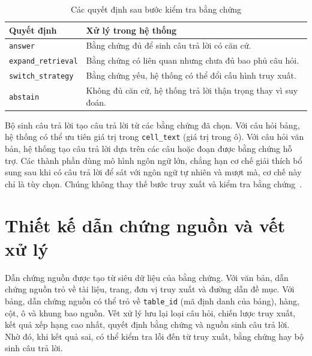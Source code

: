 \documentclass[../DoAn.tex]{subfiles}
\begin{document}
\begin{table}[H]
\centering
\small
\renewcommand{\arraystretch}{1.2}
\caption{Các quyết định sau bước kiểm tra bằng chứng}
\label{tab:evidence-check-decisions-revised}
\begin{tabularx}{\textwidth}{
    |>{\raggedright\arraybackslash}p{}
    |>{\raggedright\arraybackslash}X|
}
\hline
\textbf{Quyết định} & \textbf{Xử lý trong hệ thống} \\
\hline
\texttt{answer} &
Bằng chứng đủ để sinh câu trả lời có căn cứ. \\
\hline
\texttt{expand\_retrieval} &
Bằng chứng có liên quan nhưng chưa đủ bao phủ câu hỏi. \\
\hline
\texttt{switch\_strategy} &
Bằng chứng yếu, hệ thống có thể đổi cấu hình truy xuất. \\
\hline
\texttt{abstain} &
Không đủ căn cứ, hệ thống trả lời thận trọng thay vì suy đoán. \\
\hline
\end{tabularx}
\end{table}

Bộ sinh câu trả lời tạo câu trả lời từ các bằng chứng đã chọn. Với câu hỏi bảng, hệ
thống có thể ưu tiên giá trị trong \texttt{cell\_text} (giá trị trong ô). Với câu hỏi văn bản, hệ thống
tạo câu trả lời dựa trên các câu hoặc đoạn được bằng chứng hỗ trợ. Các thành phần dùng mô hình ngôn ngữ lớn, chẳng hạn cơ chế giải thích bổ sung sau khi có câu trả lời để sát với ngôn ngữ tự nhiên và mượt mà, cơ chế này chỉ là tùy chọn. Chúng không thay thế bước truy xuất
và kiểm tra bằng chứng~\cite{lewis2020rag}.

\section{Thiết kế dẫn chứng nguồn và vết xử lý}
\label{section:citation-trace-design}

Dẫn chứng nguồn được tạo từ siêu dữ liệu của bằng chứng. Với văn bản, dẫn chứng nguồn trỏ về tài liệu,
trang, đơn vị truy xuất và đường dẫn đề mục. Với bảng, dẫn chứng nguồn có thể trỏ về \texttt{table\_id} (mã định danh của bảng), hàng, cột,
ô và khung bao nguồn. Vết xử lý lưu lại loại câu hỏi, chiến lược truy xuất, kết quả xếp hạng cao nhất, quyết
định bằng chứng và nguồn sinh câu trả lời. Nhờ đó, khi kết quả sai, có thể kiểm tra
lỗi đến từ truy xuất, bằng chứng  hay bộ sinh câu trả lời.
\end{document}

